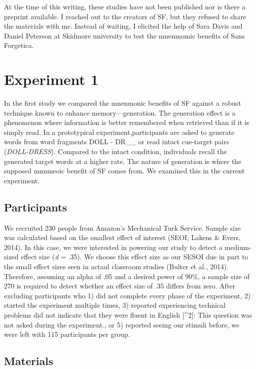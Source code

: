 \documentclass[pdf]{apa6}
\begin{document}
At the time of this writing, these studies have not been published nor is there a preprint available. I reached out to the creators of SF, but they refused to share the materials with me. Instead of waiting, I elicited the help of Sara Davis and Daniel Peterson at Skidmore university to test the mnenmomic benefits of Sans Forgetica.

\hypertarget{experiment-1}{%
\section{Experiment 1}\label{experiment-1}}

In the first study we compared the mnenmonic benefits of SF against a robust technique known to enhance memory---generation. The generation effect is a phenomenon where information is better remembered when retrieved than if it is simply read. In a prototypical experiment,participants are asked to generate words from word fragments DOLL - DR\_\_ or read intact cue-target pairs (\emph{DOLL-DRESS}). Compared to the intact condition, individuals recall the generated target words at a higher rate. The nature of generation is where the supposed mnnmeoic benefit of SF comes from. We examined this in the current experiment.

\hypertarget{participants}{%
\subsection{Participants}\label{participants}}

We recruited 230 people from Amazon's Mechanical Turk Service. Sample size was calculated based on the smallest effect of interest (SEOI; Lakens \& Evers, 2014). In this case, we were interested in powering our study to detect a medium-sized effect size (\emph{d} = .35). We choose this effect size as our SESOI due in part to the small effect sizes seen in actaul classroom studies (Bulter et al., 2014). Therefore, assuming an alpha of .05 and a desired power of 90\%, a sample size of 270 is required to detect whether an effect size of .35 differs from zero. After excluding participants who 1) did not complete every phase of the experiment, 2) started the experiment multiple times, 3) reported experiencing technical problems did not indicate that they were fluent in English {[}\^{}2{]}: This question was not asked during the experiment., or 5) reported seeing our stimuli before, we were left with 115 participants per group.

\hypertarget{materials}{%
\subsection{Materials}\label{materials}}
\end{document}
